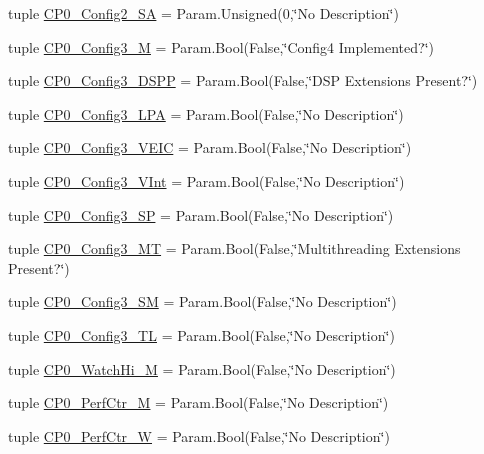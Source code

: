 \begin{DoxyCompactItemize}
\item 
tuple \hyperlink{classMipsCPU_1_1BaseMipsCPU_a288566473c627d5d943bdb535070c6a8}{CP0\_\-Config2\_\-SA} = Param.Unsigned(0,\char`\"{}No Description\char`\"{})
\item 
tuple \hyperlink{classMipsCPU_1_1BaseMipsCPU_a727d3219d5e4f7bdcb82d72f13a64d19}{CP0\_\-Config3\_\-M} = Param.Bool(False,\char`\"{}Config4 Implemented?\char`\"{})
\item 
tuple \hyperlink{classMipsCPU_1_1BaseMipsCPU_a208bccb793ea59fdb7af54de27e24e03}{CP0\_\-Config3\_\-DSPP} = Param.Bool(False,\char`\"{}DSP Extensions Present?\char`\"{})
\item 
tuple \hyperlink{classMipsCPU_1_1BaseMipsCPU_ae78c1c0ef2e48d4c2edab32f87c5f309}{CP0\_\-Config3\_\-LPA} = Param.Bool(False,\char`\"{}No Description\char`\"{})
\item 
tuple \hyperlink{classMipsCPU_1_1BaseMipsCPU_a889a4f646c6296aec6e3bf2efca23faf}{CP0\_\-Config3\_\-VEIC} = Param.Bool(False,\char`\"{}No Description\char`\"{})
\item 
tuple \hyperlink{classMipsCPU_1_1BaseMipsCPU_abc3e3d14f240130bf820a498fbc550ed}{CP0\_\-Config3\_\-VInt} = Param.Bool(False,\char`\"{}No Description\char`\"{})
\item 
tuple \hyperlink{classMipsCPU_1_1BaseMipsCPU_aede7a22f4fed840b65f555541f6a021f}{CP0\_\-Config3\_\-SP} = Param.Bool(False,\char`\"{}No Description\char`\"{})
\item 
tuple \hyperlink{classMipsCPU_1_1BaseMipsCPU_a7a0cc3ea582b4012a1e0029b494c6751}{CP0\_\-Config3\_\-MT} = Param.Bool(False,\char`\"{}Multithreading Extensions Present?\char`\"{})
\item 
tuple \hyperlink{classMipsCPU_1_1BaseMipsCPU_a621a332c019b66f6c8887eb42268d482}{CP0\_\-Config3\_\-SM} = Param.Bool(False,\char`\"{}No Description\char`\"{})
\item 
tuple \hyperlink{classMipsCPU_1_1BaseMipsCPU_a2a738d8d82ad8b446ad32fc87a285cc1}{CP0\_\-Config3\_\-TL} = Param.Bool(False,\char`\"{}No Description\char`\"{})
\item 
tuple \hyperlink{classMipsCPU_1_1BaseMipsCPU_ae758ddb5898340503534e2f96d547ed3}{CP0\_\-WatchHi\_\-M} = Param.Bool(False,\char`\"{}No Description\char`\"{})
\item 
tuple \hyperlink{classMipsCPU_1_1BaseMipsCPU_adefb92facb100633d7ad9dafa11449c8}{CP0\_\-PerfCtr\_\-M} = Param.Bool(False,\char`\"{}No Description\char`\"{})
\item 
tuple \hyperlink{classMipsCPU_1_1BaseMipsCPU_a7ba3612c0102a54df51f9a0770681041}{CP0\_\-PerfCtr\_\-W} = Param.Bool(False,\char`\"{}No Description\char`\"{})

\end{DoxyCompactItemize}
